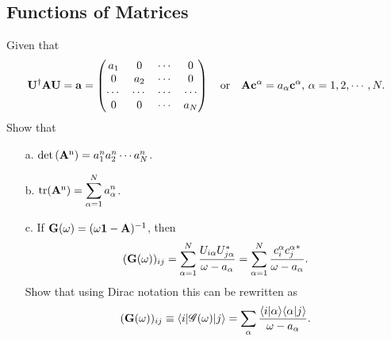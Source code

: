 \documentclass[a4paper]{book}
\newcounter{exercise}[chapter]
\newcommand\tr[1]{\mathrm{tr(#1)}}
\renewcommand\det[1]{\mathrm{det\left(#1\right)}}
\newcommand{\A}{{\bf A}}
\newcommand{\I}{{\bf 1}}
\newcommand{\U}{{\bf U}}
\begin{document}
	\subsection{Functions of Matrices}
	
	\begin{exercise}
	Given that
	\begin{equation*}
		\U^\dagger \A \U = {\bf a} = \begin{pmatrix} a_1 & 0 & \cdots & 0 \\ 0 & a_2 & \cdots & 0 \\ \cdots & \cdots & \cdots & \cdots \\ 0 & 0 & \cdots & a_N \end{pmatrix} \quad \text{or} \quad \A {\bf c^\alpha} = a_\alpha {\bf c^\alpha} , \, \alpha = 1,2,\cdots, N.
	\end{equation*}
	Show that
	\begin{enumerate}
	
	\item[a.] $\det{\A^n}=a^n_1 a^n_2 \cdots a^n_N$.

	\item[b.] $\tr{\A^n}=\displaystyle\sum_{\alpha=1}^N a^n_\alpha$.
	
	\item[c.] If ${\bf G}(\omega) = (\omega\I - \A)^{-1}$, then
	\begin{equation*}
		({\bf G}(\omega))_{ij} = \sum_{\alpha=1}^N \frac{U_{i\alpha}U^*_{j\alpha}}{\omega-a_\alpha} = \sum_{\alpha=1}^N \frac{c^\alpha_i {c^\alpha_j}^*}{\omega-a_\alpha}.
	\end{equation*}
	Show that using Dirac notation this can be rewritten as
	\begin{equation*}
		({\bf G}(\omega))_{ij} \equiv \langle i | \mathscr{G}(\omega) | j \rangle = \sum_{\alpha} \frac{\langle i | \alpha \rangle \langle \alpha | j \rangle }{\omega - a_\alpha}.
	\end{equation*}
	\end{enumerate}
	
	\end{exercise}
	
\end{document}
